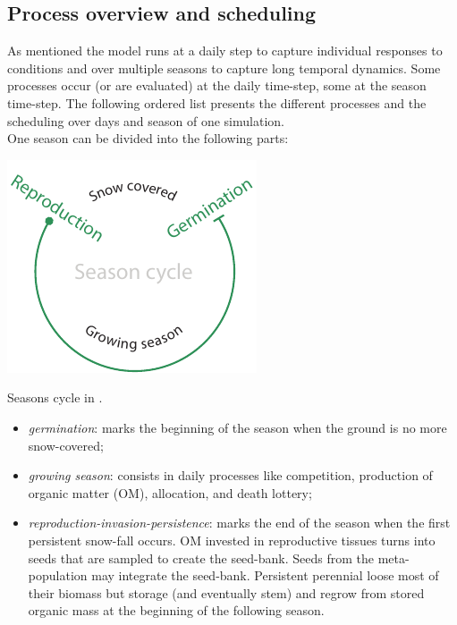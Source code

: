 
\subsection{Process overview and scheduling}

As mentioned the model runs at a daily step to capture individual responses to conditions and over multiple seasons to capture long temporal dynamics. Some processes occur (or are evaluated) at the daily time-step, some at the season time-step. The following ordered list presents the different processes and the scheduling over days and season of one simulation.\\
\indent One season can be divided into the following parts:
\begin{marginfigure}[-12pt]
\includegraphics{./Figures/season_cycle_m.pdf}
\caption{Seasons cycle in \model.}
\end{marginfigure}
\begin{itemize}
\setlength\itemsep{0em}
\item \textit{germination}: marks the beginning of the season when the ground is no more snow-covered;
\item \textit{growing season}: consists in daily processes like competition, production of organic matter (OM), allocation, and death lottery;
\item \textit{reproduction-invasion-persistence}: marks the end of the season when the first persistent snow-fall occurs. OM invested in reproductive tissues turns into seeds that are sampled to create the seed-bank. Seeds from the meta-population may integrate the seed-bank. Persistent perennial loose most of their biomass but storage (and eventually stem) and regrow from stored organic mass at the beginning of the following season.
\end{itemize}

